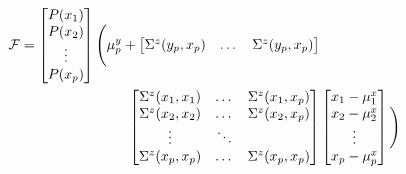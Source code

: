 \begin{equation}
	\begin{split}
		\mathcal F=\begin{bmatrix}
			P(x_1) \\
			P(x_2) \\
			\vdots \\
			P(x_p) \\
		\end{bmatrix}\Bigg(
			\mu_p^y + 
		\begin{bmatrix}
			\Sigma^z(y_p,x_p) & \dots & \Sigma^z(y_p,x_p)\\
		\end{bmatrix} & \\
		\begin{bmatrix}
			\Sigma^z(x_1,x_1) & \dots & \Sigma^z(x_1,x_p) \\
			\Sigma^z(x_2,x_2) & \dots & \Sigma^z(x_2,x_p)\\
			\vdots & \ddots & \\
			\Sigma^z(x_p,x_p) & \dots & \Sigma^z(x_p,x_p)\\
		\end{bmatrix} &
		\begin{bmatrix}
			x_1 - \mu_1^x \\
			x_2 - \mu_2^x \\
			\vdots \\
			x_p - \mu_p^x \\
		\end{bmatrix}\Bigg)
	\end{split}
\end{equation}

